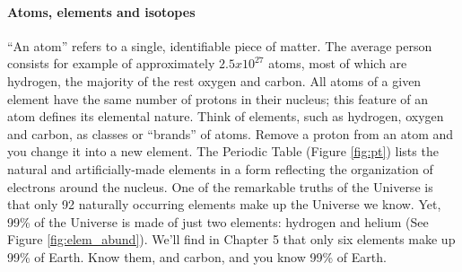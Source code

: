 \paragraph{Atoms, elements and isotopes}
``An atom'' refers to a single, identifiable piece of matter. The average person consists for example of approximately $2.5x10^{27}$ atoms, most of which are hydrogen, the majority of the rest oxygen and carbon. All atoms of a given element have the same number of protons in their nucleus; this feature of an atom defines its elemental nature. Think of elements, such as hydrogen, oxygen and carbon, as classes or ``brands'' of atoms. Remove a proton from an atom and you change it into a new element. The Periodic Table (Figure \ref{fig:pt}) lists the natural and artificially-made elements in a form reflecting the organization of electrons around the nucleus. One of the remarkable truths of the Universe is that only 92 naturally occurring elements make up the Universe we know. Yet, 99\% of the Universe is made of just two elements: hydrogen and helium (See Figure \ref{fig:elem_abund}). We'll find in Chapter 5 that only six elements make up 99\% of Earth. Know them, and carbon, and you know 99\% of Earth.\\

